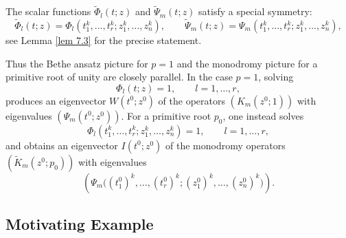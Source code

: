 \documentclass[12pt]{amsart}
\theoremstyle{definition} %
\numberwithin{equation}{section}
\theoremstyle{definition}
\begin{document}
The scalar functions $\tilde \Phi_l(t;z)$ and $\tilde \Psi_m(t;z)$ satisfy a special symmetry:
\[
\tilde \Phi_l(t;z)=\Phi_l(t_1^k,\dots,t_r^k;z_1^k,\dots,z_n^k),
\qquad
\tilde \Psi_m(t;z)=\Psi_m(t_1^k,\dots,t_r^k;z_1^k,\dots,z_n^k),
\]
see Lemma \ref{lem 7.3} for the precise statement.

Thus the Bethe ansatz picture for $p=1$ and the monodromy picture for a primitive root of
unity are closely parallel. In the case $p=1$, solving
\[
\Phi_l(t;z)=1,
\qquad l=1,\dots,r,
\]
produces an eigenvector $W(t^0;z^0)$ of the operators $(K_m(z^0;1))$ with eigenvalues
$(\Psi_m(t^0;z^0))$. For a primitive root $p_0$, one instead solves
\[
\Phi_l(t_1^k,\dots,t_r^k;z_1^k,\dots,z_n^k)=1,
\qquad l=1,\dots,r,
\]
and obtains an eigenvector $I(t^0;z^0)$ of the monodromy operators $(\tilde K_m(z^0;p_0))$
with eigenvalues
\[
(\Psi_m\bigl((t_1^0)^k,\dots,(t_r^0)^k;(z_1^0)^k,\dots,(z_n^0)^k\bigr)).
\]

\subsection{Motivating Example}
\label{n=2 p=-1}\rm
\end{document}
